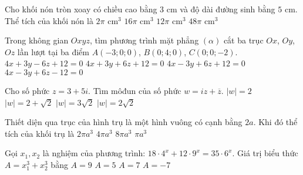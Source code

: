\begin{ex}%
Cho khối nón tròn xoay có chiều cao bằng $3$ cm và độ dài đường sinh bằng $5$ cm. Thể tích của khối nón là
\choice
{$2\pi$ cm$^3$}
{\True $16\pi$ cm$^3$}
{$12\pi$ cm$^3$}
{$48\pi$ cm$^3$}
\end{ex}
\begin{ex}%
Trong không gian $Oxyz$, tìm phương trình mặt phẳng $\left(\alpha\right)$ cắt ba trục $Ox$, $Oy$, $Oz$ lần lượt tại ba điểm $A\left(-3;0;0\right)$, $B\left(0;4;0\right)$, $C\left(0;0;-2\right)$.
\choice
{$4x + 3y - 6z + 12 = 0$}
{$4x + 3y + 6z + 12 = 0$}
{\True $4x - 3y + 6z + 12 = 0$}
{$4x - 3y + 6z - 12 = 0$}
\end{ex}
\begin{ex}%
Cho số phức $z = 3 + 5i$. Tìm môđun của số phức $w = iz + \overline{z}$.
\choice
{$\left|w\right| = 2$}
{$\left|w\right| = 2 + \sqrt{2}$}
{$\left|w\right| = 3\sqrt{2}$}
{\True $\left|w\right| = 2\sqrt{2}$}
\end{ex}
\begin{ex}%
Thiết diện qua trục của hình trụ là một hình vuông có cạnh bằng $2a$. Khi đó thể tích của khối trụ là
\choice
{\True $2\pi a^3$}
{$4\pi a^3$}
{$8\pi a^3$}
{$\pi a^3$}
\end{ex}
\begin{ex}%
Gọi $x_1, x_2$ là nghiệm của phương trình: $18\cdot4^x + 12\cdot9^x = 35\cdot6^x$. Giá trị biểu thức $A = x_1^3 + x_2^3$ bằng
\choice
{$A = 9$}
{$A = 5$}
{\True $A = 7$}
{$A = - 7$}
\end{ex}
